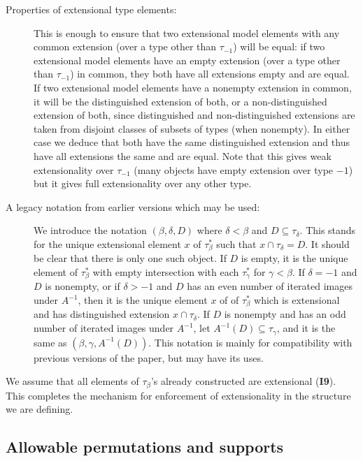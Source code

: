 \documentclass[112pt]{article}
\begin{document}
\begin{description}
\item[Properties of extensional type elements:]   This is enough to ensure that two extensional model elements with any common extension (over a type other than $\tau_{-1}$) will be equal:  if two extensional model elements have an empty extension (over a type other than $\tau_{-1}$) in common, they both have all extensions empty and are equal.  If two extensional model elements have a nonempty extension in common, it will be the distinguished extension of both, or a non-distinguished extension of both, since distinguished and non-distinguished extensions are taken from disjoint classes of subsets of types (when nonempty).
In either case we deduce that both have the same distinguished extension and thus have all extensions the same and are equal.  Note that this gives weak extensionality over $\tau_{-1}$ (many objects have empty extension over type $-1$) but it gives full extensionality over any other type.

\item[A legacy notation from earlier versions which may be used:]  We introduce the notation $(\beta,\delta,D)$ where $\delta<\beta$ and  $D \subseteq \tau_\delta$.   This stands for the unique extensional element $x$ of $\tau_\beta^*$ such that $x \cap \tau_\delta = D$.  It should be clear that there is only one such object.  If $D$ is empty, it is the unique
element of $\tau_\beta^*$ with empty intersection with each $\tau_\gamma^*$ for $\gamma<\beta$.  If $\delta=-1$ and $D$ is nonempty, or if $\delta >-1$
and $D$ has an even number of iterated images under $A^{-1}$, then it is the unique element $x$ of of $\tau_\beta^*$ which is extensional and has distinguished extension $x \cap \tau_\delta$.  If $D$ is nonempty and has an odd number of iterated images under $A^{-1}$, let $A^{-1}(D) \subseteq \tau_\gamma$, and it is the same as $(\beta,\gamma,A^{-1}(D))$.  This notation is mainly for compatibility with previous versions of the paper, but may have its uses.

\end{description}

We assume that all elements of $\tau_\beta$'s already constructed are extensional ({\bf I9}).  This completes the mechanism for enforcement of extensionality in the structure we are defining.

\subsection{Allowable permutations and supports}
\end{document}
